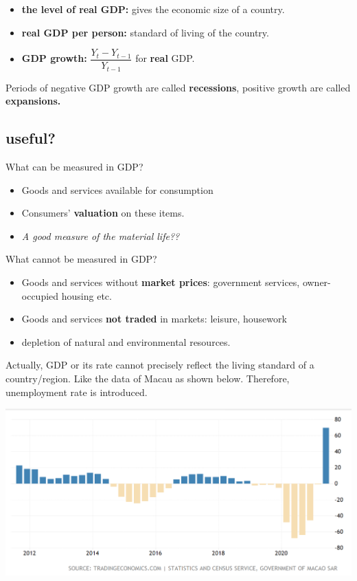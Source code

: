 \documentclass[11pt, a4paper]{ECON2123}
\begin{document}
\begin{spacing}{1.5}
    \begin{itemize}
        \item {\bf the level of real GDP:} gives the economic 
        size of a country.
        \item {\bf real GDP per person:} standard of living of the country.
        \item {\bf GDP growth:} $\dfrac{Y_t-Y_{t-1}}{Y_{t-1}}$ for {\bf real} GDP.
    \end{itemize}

    Periods of negative GDP growth are called {\bf recessions},
    positive growth are called {\bf expansions.}

    
    \subsection{useful?}

    What can be measured in GDP?
    \begin{itemize}
        \item Goods and services available for consumption
        \item Consumers' {\bf valuation} on these items.
        \item {\it A good measure of the material life??}
    \end{itemize}

    What cannot be measured in GDP?
    \begin{itemize}
        \item Goods and services without {\bf market prices}:
        government services, owner-occupied housing etc.
        \item Goods and services {\bf not traded} in markets:
        leisure, housework
        \item depletion of natural and environmental resources.
    \end{itemize}

    Actually, GDP or its rate cannot precisely reflect the living 
    standard of a country/region. Like the data of Macau as shown below.
    Therefore, unemployment rate is introduced.
    \begin{center}
        \includegraphics[scale=0.4]{images/0102-macau-gdp.png}
    \end{center}


\end{spacing}
\end{document}
